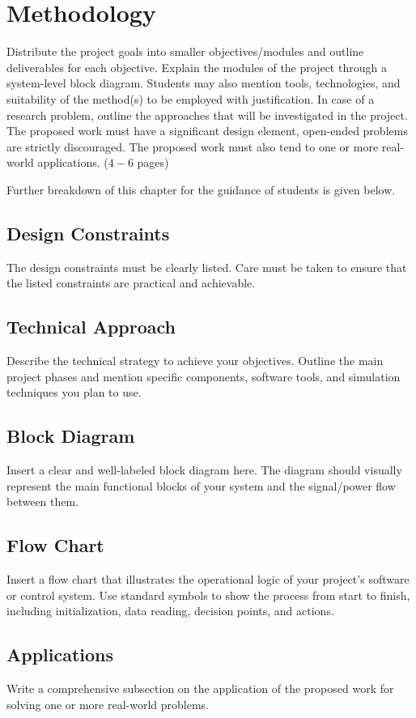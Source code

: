 
\chapter{Methodology}
\label{Chapter5}

Distribute the project goals into smaller objectives/modules and outline deliverables for each objective. Explain the modules of the project through a system-level block diagram. Students may also mention tools, technologies, and suitability of the method(s) to be employed with justification. In case of a research problem, outline the approaches that will be investigated in the project. The proposed work must have a significant design element, open-ended problems are strictly discouraged. The proposed work must also tend to one or more real-world applications. ($4-6$ pages)

Further breakdown of this chapter for the guidance of students is given below.

\section{Design Constraints}
\label{sec:DC}

The design constraints must be clearly listed. Care must be taken to ensure that the listed constraints are practical and achievable.

\section{Technical Approach}
\label{sec:TA}

Describe the technical strategy to achieve your objectives. Outline the main project phases and mention specific components, software tools, and simulation techniques you plan to use.

\section{Block Diagram}
\label{sec:BD}

Insert a clear and well-labeled block diagram here. The diagram should visually represent the main functional blocks of your system and the signal/power flow between them.

\section{Flow Chart}
\label{sec:FC}

Insert a flow chart that illustrates the operational logic of your project's software or control system. Use standard symbols to show the process from start to finish, including initialization, data reading, decision points, and actions.

\section{Applications}
\label{sec:app}

Write a comprehensive subsection on the application of the proposed work for solving one or more real-world problems.